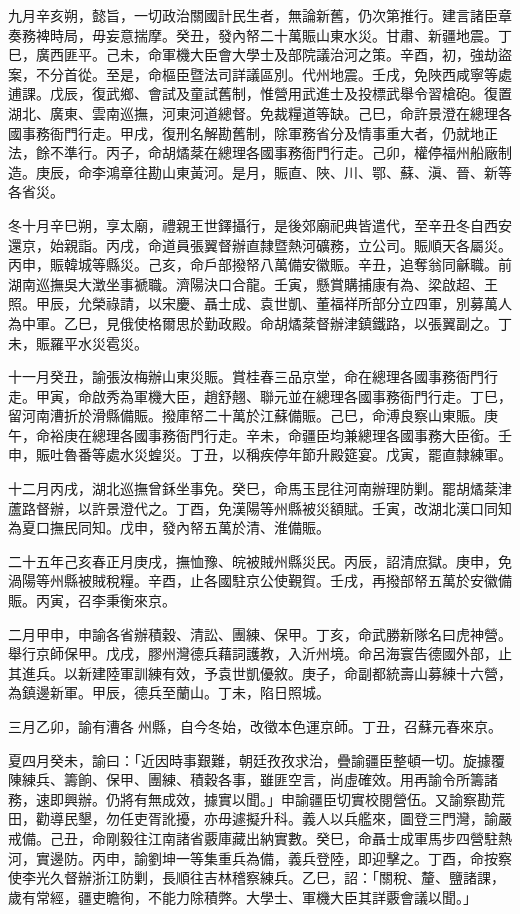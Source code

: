 \begin{pinyinscope}
九月辛亥朔，懿旨，一切政治關國計民生者，無論新舊，仍次第推行。建言諸臣章奏務裨時局，毋妄意揣摩。癸丑，發內帑二十萬賑山東水災。甘肅、新疆地震。丁巳，廣西匪平。己未，命軍機大臣會大學士及部院議治河之策。辛酉，初，強劫盜案，不分首從。至是，命樞臣暨法司詳議區別。代州地震。壬戌，免陜西咸寧等處逋課。戊辰，復武鄉、會試及童試舊制，惟營用武進士及投標武舉令習槍砲。復置湖北、廣東、雲南巡撫，河東河道總督。免裁糧道等缺。己巳，命許景澄在總理各國事務衙門行走。甲戌，復刑名解勘舊制，除軍務省分及情事重大者，仍就地正法，餘不準行。丙子，命胡燏棻在總理各國事務衙門行走。己卯，權停福州船廠制造。庚辰，命李鴻章往勘山東黃河。是月，賑直、陜、川、鄂、蘇、滇、晉、新等各省災。

冬十月辛巳朔，享太廟，禮親王世鐸攝行，是後郊廟祀典皆遣代，至辛丑冬自西安還京，始親詣。丙戌，命道員張翼督辦直隸暨熱河礦務，立公司。賑順天各屬災。丙申，賑韓城等縣災。己亥，命戶部撥帑八萬備安徽賑。辛丑，追奪翁同龢職。前湖南巡撫吳大澂坐事褫職。濟陽決口合龍。壬寅，懸賞購捕康有為、梁啟超、王照。甲辰，允榮祿請，以宋慶、聶士成、袁世凱、董福祥所部分立四軍，別募萬人為中軍。乙巳，見俄使格爾思於勤政殿。命胡燏棻督辦津鎮鐵路，以張翼副之。丁未，賑羅平水災雹災。

十一月癸丑，諭張汝梅辦山東災賑。賞桂春三品京堂，命在總理各國事務衙門行走。甲寅，命啟秀為軍機大臣，趙舒翹、聯元並在總理各國事務衙門行走。丁巳，留河南漕折於滑縣備賑。撥庫帑二十萬於江蘇備賑。己巳，命溥良察山東賑。庚午，命裕庚在總理各國事務衙門行走。辛未，命疆臣均兼總理各國事務大臣銜。壬申，賑吐魯番等處水災蝗災。丁丑，以稱疾停年節升殿筵宴。戊寅，罷直隸練軍。

十二月丙戌，湖北巡撫曾鉌坐事免。癸巳，命馬玉昆往河南辦理防剿。罷胡燏棻津蘆路督辦，以許景澄代之。丁酉，免漢陽等州縣被災額賦。壬寅，改湖北漢口同知為夏口撫民同知。戊申，發內帑五萬於清、淮備賑。

二十五年己亥春正月庚戌，撫恤豫、皖被賊州縣災民。丙辰，詔清庶獄。庚申，免渦陽等州縣被賊稅糧。辛酉，止各國駐京公使覲賀。壬戌，再撥部帑五萬於安徽備賑。丙寅，召李秉衡來京。

二月甲申，申諭各省辦積穀、清訟、團練、保甲。丁亥，命武勝新隊名曰虎神營。舉行京師保甲。戊戌，膠州灣德兵藉詞護教，入沂州境。命呂海寰告德國外部，止其進兵。以新建陸軍訓練有效，予袁世凱優敘。庚子，命副都統壽山募練十六營，為鎮邊新軍。甲辰，德兵至蘭山。丁未，陷日照城。

三月乙卯，諭有漕各州縣，自今冬始，改徵本色運京師。丁丑，召蘇元春來京。

夏四月癸未，諭曰：「近因時事艱難，朝廷孜孜求治，疊諭疆臣整頓一切。旋據覆陳練兵、籌餉、保甲、團練、積穀各事，雖匪空言，尚虛確效。用再諭令所籌諸務，速即興辦。仍將有無成效，據實以聞。」申諭疆臣切實校閱營伍。又諭察勘荒田，勸導民墾，勿任吏胥訛擾，亦毋遽擬升科。義人以兵艦來，圖登三門灣，諭嚴戒備。己丑，命剛毅往江南諸省覈庫藏出納實數。癸巳，命聶士成軍馬步四營駐熱河，實邊防。丙申，諭劉坤一等集重兵為備，義兵登陸，即迎擊之。丁酉，命按察使李光久督辦浙江防剿，長順往吉林稽察練兵。乙巳，詔：「關稅、釐、鹽諸課，歲有常經，疆吏瞻徇，不能力除積弊。大學士、軍機大臣其詳覈會議以聞。」


\end{pinyinscope}
